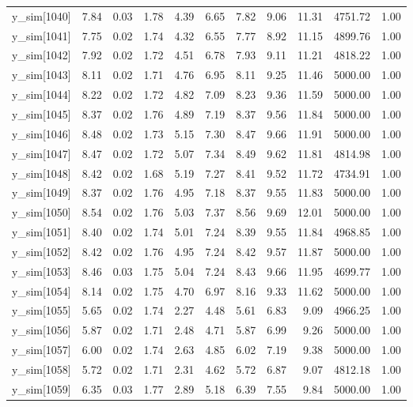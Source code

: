 \begin{table}[ht]
\begin{tabular}{rrrrrrrrrrr}
  y\_sim[1040] & 7.84 & 0.03 & 1.78 & 4.39 & 6.65 & 7.82 & 9.06 & 11.31 & 4751.72 & 1.00 \\ 
  y\_sim[1041] & 7.75 & 0.02 & 1.74 & 4.32 & 6.55 & 7.77 & 8.92 & 11.15 & 4899.76 & 1.00 \\ 
  y\_sim[1042] & 7.92 & 0.02 & 1.72 & 4.51 & 6.78 & 7.93 & 9.11 & 11.21 & 4818.22 & 1.00 \\ 
  y\_sim[1043] & 8.11 & 0.02 & 1.71 & 4.76 & 6.95 & 8.11 & 9.25 & 11.46 & 5000.00 & 1.00 \\ 
  y\_sim[1044] & 8.22 & 0.02 & 1.72 & 4.82 & 7.09 & 8.23 & 9.36 & 11.59 & 5000.00 & 1.00 \\ 
  y\_sim[1045] & 8.37 & 0.02 & 1.76 & 4.89 & 7.19 & 8.37 & 9.56 & 11.84 & 5000.00 & 1.00 \\ 
  y\_sim[1046] & 8.48 & 0.02 & 1.73 & 5.15 & 7.30 & 8.47 & 9.66 & 11.91 & 5000.00 & 1.00 \\ 
  y\_sim[1047] & 8.47 & 0.02 & 1.72 & 5.07 & 7.34 & 8.49 & 9.62 & 11.81 & 4814.98 & 1.00 \\ 
  y\_sim[1048] & 8.42 & 0.02 & 1.68 & 5.19 & 7.27 & 8.41 & 9.52 & 11.72 & 4734.91 & 1.00 \\ 
  y\_sim[1049] & 8.37 & 0.02 & 1.76 & 4.95 & 7.18 & 8.37 & 9.55 & 11.83 & 5000.00 & 1.00 \\ 
  y\_sim[1050] & 8.54 & 0.02 & 1.76 & 5.03 & 7.37 & 8.56 & 9.69 & 12.01 & 5000.00 & 1.00 \\ 
  y\_sim[1051] & 8.40 & 0.02 & 1.74 & 5.01 & 7.24 & 8.39 & 9.55 & 11.84 & 4968.85 & 1.00 \\ 
  y\_sim[1052] & 8.42 & 0.02 & 1.76 & 4.95 & 7.24 & 8.42 & 9.57 & 11.87 & 5000.00 & 1.00 \\ 
  y\_sim[1053] & 8.46 & 0.03 & 1.75 & 5.04 & 7.24 & 8.43 & 9.66 & 11.95 & 4699.77 & 1.00 \\ 
  y\_sim[1054] & 8.14 & 0.02 & 1.75 & 4.70 & 6.97 & 8.16 & 9.33 & 11.62 & 5000.00 & 1.00 \\ 
  y\_sim[1055] & 5.65 & 0.02 & 1.74 & 2.27 & 4.48 & 5.61 & 6.83 & 9.09 & 4966.25 & 1.00 \\ 
  y\_sim[1056] & 5.87 & 0.02 & 1.71 & 2.48 & 4.71 & 5.87 & 6.99 & 9.26 & 5000.00 & 1.00 \\ 
  y\_sim[1057] & 6.00 & 0.02 & 1.74 & 2.63 & 4.85 & 6.02 & 7.19 & 9.38 & 5000.00 & 1.00 \\ 
  y\_sim[1058] & 5.72 & 0.02 & 1.71 & 2.31 & 4.62 & 5.72 & 6.87 & 9.07 & 4812.18 & 1.00 \\ 
  y\_sim[1059] & 6.35 & 0.03 & 1.77 & 2.89 & 5.18 & 6.39 & 7.55 & 9.84 & 5000.00 & 1.00 \\ 

\end{tabular}
\end{table}
